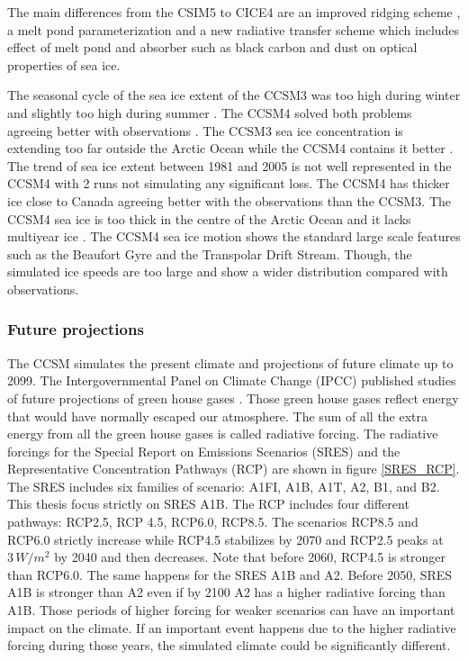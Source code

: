 The main differences from the CSIM5 to CICE4 are an improved ridging scheme \citep{JGRC:JGRC10227}, a melt pond parameterization \citep{Holland:2011ly} and a new radiative transfer scheme \citep{Briegleb:2007ve} which includes effect of melt pond and absorber such as black carbon and dust on optical properties of sea ice. 

The seasonal cycle of the sea ice extent of the CCSM3 was too high during winter and slightly too high during summer \citep{holland2006c}. The CCSM4 solved both problems agreeing better with observations \citep{2012jahn}. The CCSM3 sea ice concentration is extending too far outside the Arctic Ocean while the CCSM4 contains it better \citep{gent2011}. The trend of sea ice extent between 1981 and 2005 is not well represented in the CCSM4 with 2 runs not simulating any significant loss. The CCSM4 has thicker ice close to Canada agreeing better with the observations than the CCSM3. The CCSM4 sea ice is too thick in the centre of the Arctic Ocean and it lacks  multiyear ice \citep{2012jahn}. The CCSM4 sea ice motion shows the standard large scale features such as the Beaufort Gyre and the Transpolar Drift Stream. Though, the simulated ice speeds are too large and show a wider distribution compared with observations.

\subsubsection{Future projections}\label{fs}

The CCSM simulates the present climate and projections of future climate up to 2099. The Intergovernmental Panel on Climate Change (IPCC) published studies of future projections of green house gases \citep{IPCC4,IPCC5}. Those green house gases reflect energy that would have normally escaped our atmosphere. The sum of all the extra energy from all the green house gases is called radiative forcing. The radiative forcings for the Special Report on Emissions Scenarios (SRES) \citep{IPCC4} and the Representative Concentration Pathways (RCP) \citep{IPCC5} are shown in figure \ref{SRES_RCP}. The SRES includes six families of scenario: A1FI, A1B, A1T, A2, B1, and B2. This thesis focus strictly on SRES A1B. The RCP includes four different pathways: RCP2.5, RCP 4.5, RCP6.0, RCP8.5. The scenarios RCP8.5 and RCP6.0 strictly increase while RCP4.5 stabilizes by 2070 and RCP2.5 peaks at $3\,W/m^2$ by 2040 and then decreases. Note that before 2060, RCP4.5 is stronger than RCP6.0. The same happens for the SRES A1B and A2. Before 2050, SRES A1B is stronger than A2 even if by 2100 A2 has a higher radiative forcing than A1B. Those periods of higher forcing for weaker scenarios can have an important impact on the climate. If an important event happens due to the higher radiative forcing during those years, the simulated climate could be significantly different. 

